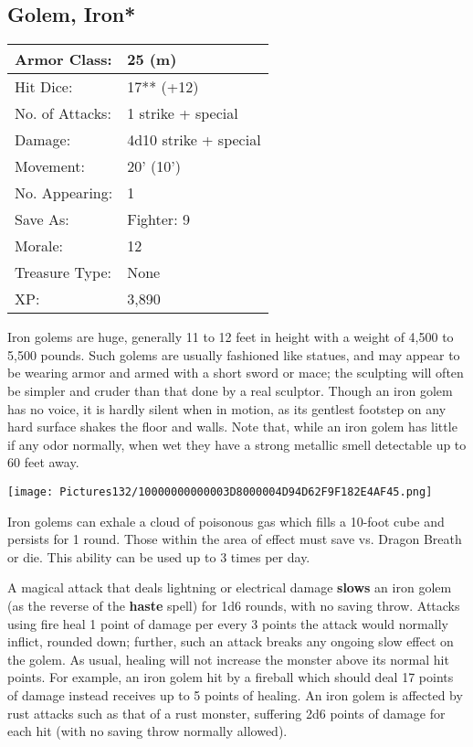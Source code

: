 \documentclass[a4paper,twoside,openany,10pt]{book}
\begin{document}
\begin{multicols}{2}
\subsection*{Golem, Iron*}\label{golem-iron}

\begin{tabularx}{0.48\textwidth}{@{}lX@{}}
Armor Class: & 25 (m) \\\hline
Hit Dice: & 17** (+12) \\\hline
No. of Attacks: & 1 strike + special \\\hline
Damage: & 4d10 strike + special \\\hline
Movement: & 20' (10') \\\hline
No. Appearing: & 1 \\\hline
Save As: & Fighter: 9 \\\hline
Morale: & 12 \\\hline
Treasure Type: & None \\\hline
XP: & 3,890 \\\hline
\end{tabularx}

Iron golems are huge, generally 11 to 12 feet in height with a weight of 4,500 to 5,500 pounds. Such golems are usually fashioned like statues, and may appear to be wearing armor and armed with a short sword or mace; the sculpting will often be simpler and cruder than that done by a real sculptor. Though an iron golem has no voice, it is hardly silent when in motion, as its gentlest footstep on any hard surface shakes the floor and walls. Note that, while an iron golem has little if any odor normally, when wet they have a strong metallic smell detectable up to 60 feet away.

\begin{center}
	\texttt{[image: Pictures132/10000000000003D8000004D94D62F9F182E4AF45.png]}
\end{center}

Iron golems can exhale a cloud of poisonous gas which fills a 10-foot cube and persists for 1 round. Those within the area of effect must save vs. Dragon Breath or die. This ability can be used up to 3 times per day.


A magical attack that deals lightning or electrical damage \textbf{slows} an iron golem (as the reverse of the \textbf{haste} spell) for 1d6 rounds, with no saving throw. Attacks using fire heal 1 point of damage per every 3 points the attack would normally inflict, rounded down; further, such an attack breaks any ongoing slow effect on the golem. As usual, healing will not increase the monster above its normal hit points. For example, an iron golem hit by a fireball which should deal 17 points of damage instead receives up to 5 points of healing. An iron golem is affected by rust attacks such as that of a rust monster, suffering 2d6 points of damage for each hit (with no saving throw normally allowed).


\end{multicols}
\end{document}
